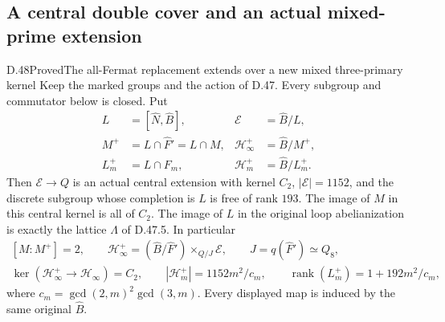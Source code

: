 \subsection{A central double cover and an actual mixed-prime extension}

\begin{statement}{D.48}{Proved}{The all-Fermat replacement extends over a new mixed three-primary kernel}
Keep the marked groups and the action of D.47. Every subgroup
and commutator below is closed. Put
\[
 \begin{aligned}
 L&=[\widehat N,\widehat B],&
 \mathcal E&=\widehat B/L,\\
 M^+&=L\cap\widehat F'=L\cap M,&
 \mathcal H^+_\infty&=\widehat B/M^+,\\
 L_m^+&=L\cap F_m,&
 \mathcal H_m^+&=\widehat B/L_m^+.
 \end{aligned}                                                     \tag{D.48.1}
\]
Then \(\mathcal E\to Q\) is an actual central extension with
kernel \(C_2\), \(|\mathcal E|=1152\), and the discrete subgroup
whose completion is \(L\) is free of rank \(193\).
The image of \(M\) in this central kernel is all of \(C_2\).
The image of \(L\) in the original loop abelianization is
exactly the lattice \(\Lambda\) of D.47.5. In particular
\[
 \begin{gathered}
 [M:M^+]=2,\qquad
 \mathcal H^+_\infty
    =(\widehat B/\widehat F')\times_{Q/J}\mathcal E,
       \qquad J=q(\widehat F')\simeq Q_8,\\
 \ker(\mathcal H^+_\infty\to\mathcal H_\infty)=C_2,
 \qquad
 |\mathcal H_m^+|=1152m^2/c_m,\qquad
 \operatorname{rank}(L_m^+)=1+192m^2/c_m,
 \end{gathered}                                                   \tag{D.48.2}
\]
where \(c_m=\gcd(2,m)^2\gcd(3,m)\). Every displayed map is
induced by the same original \(\widehat B\).


\end{statement}
